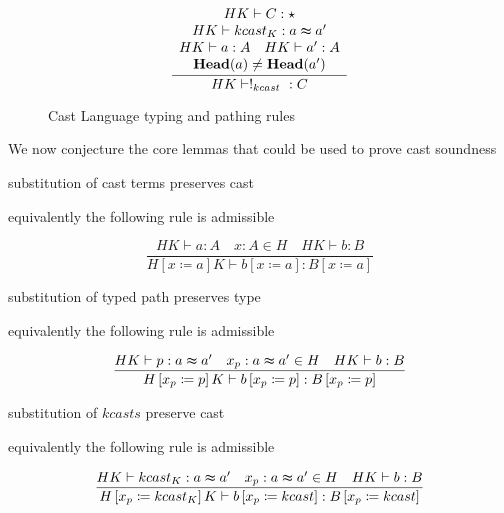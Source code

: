 \begin{figure}

\[
\frac{\begin{array}{c}
HK\vdash C:\star\\
HK\vdash kcast_{K}:a\thickapprox a'\\
HK\vdash a:A\quad HK\vdash a':A\\
\mathbf{Head}(a)\neq\mathbf{Head}(a')
\end{array}}{HK\vdash!_{kcast}\ :C}
\]


\caption{Cast Language typing and pathing rules}
\label{fig:cast-data-ty}
\end{figure}


We now conjecture the core lemmas that could be used to prove cast
soundness
\begin{conjecture}
substitution of cast terms preserves cast

equivalently the following rule is admissible

\[
\frac{HK\vdash a:A\quad x:A\in H\quad HK\vdash b:B}{H\left[x\coloneqq a\right]K\vdash b\left[x\coloneqq a\right]:B\left[x\coloneqq a\right]}
\]
\end{conjecture}

\begin{conjecture}
substitution of typed path preserves type

equivalently the following rule is admissible

\[
\frac{HK\vdash p:a\thickapprox a'\quad x_{p}:a\thickapprox a'\in H\quad HK\vdash b:B}{H\left[x_{p}\coloneqq p\right]K\vdash b\left[x_{p}\coloneqq p\right]:B\left[x_{p}\coloneqq p\right]}
\]
\end{conjecture}

\begin{conjecture}
substitution of $kcasts$ preserve cast

equivalently the following rule is admissible

\[
\frac{HK\vdash kcast_{K}:a\thickapprox a'\quad x_{p}:a\thickapprox a'\in H\quad HK\vdash b:B}{H\left[x_{p}\coloneqq kcast_{K}\right]K\vdash b\left[x_{p}\coloneqq kcast\right]:B\left[x_{p}\coloneqq kcast\right]}
\]
\end{conjecture}

